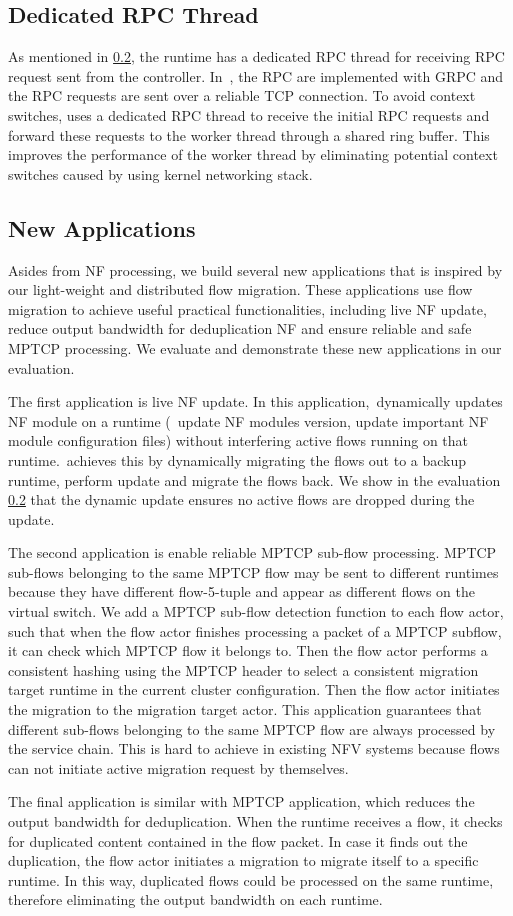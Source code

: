 \subsection{Dedicated RPC Thread}
As mentioned in \ref{}, the runtime has a dedicated RPC thread for receiving RPC request sent from the controller. In~\nfactor, the RPC are implemented with GRPC \cite{grpc} and the RPC requests are sent over a reliable TCP connection. To avoid context switches, \nfactor uses a dedicated RPC thread to receive the initial RPC requests and forward these requests to the worker thread through a shared ring buffer. This improves the performance of the worker thread by eliminating potential context switches caused by using kernel networking stack.

\subsection{New Applications}
Asides from NF processing, we build several new applications that is inspired by our light-weight and distributed flow migration. These applications use flow migration to achieve useful practical functionalities, including live NF update, reduce output bandwidth for deduplication NF and ensure reliable and safe MPTCP processing. We evaluate and demonstrate these new applications in our evaluation.

The first application is live NF update. In this application,~\nfactor dynamically updates NF module on a runtime (\ie~update NF modules version, update important NF module configuration files) without interfering active flows running on that runtime.~\nfactor achieves this by dynamically migrating the flows out to a backup runtime, perform update and migrate the flows back. We show in the evaluation \ref{} that the dynamic update ensures no active flows are dropped during the update.

The second application is enable reliable MPTCP \cite{} sub-flow processing. MPTCP sub-flows belonging to the same MPTCP flow may be sent to different runtimes because they have different flow-5-tuple and appear as different flows on the virtual switch. We add a MPTCP sub-flow detection function to each flow actor, such that when the flow actor finishes processing a packet of a MPTCP subflow, it can check which MPTCP flow it belongs to. Then the flow actor performs a consistent hashing using the MPTCP header to select a consistent migration target runtime in the current cluster configuration. Then the flow actor initiates the migration to the migration target actor. This application guarantees that different sub-flows belonging to the same MPTCP flow are always processed by the service chain. This is hard to achieve in existing NFV systems because flows can not initiate active migration request by themselves.

The final application is similar with MPTCP application, which reduces the output bandwidth for deduplication. When the runtime receives a flow, it checks for duplicated content contained in the flow packet. In case it finds out the duplication, the flow actor initiates a migration to migrate itself to a specific runtime. In this way, duplicated flows could be processed on the same runtime, therefore eliminating the output bandwidth on each runtime.
